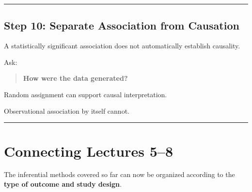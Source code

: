 \documentclass[
  letterpaper,
  DIV=11,
  numbers=noendperiod]{scrreprt}
\begin{document}
\begin{center}\rule{0.5\linewidth}{0.5pt}\end{center}

\section{Step 10: Separate Association from
Causation}\label{step-10-separate-association-from-causation}

A statistically significant association does not automatically establish
causality.

Ask:

\begin{quote}
\textbf{How were the data generated?}
\end{quote}

Random assignment can support causal interpretation.

Observational association by itself cannot.

\begin{center}\rule{0.5\linewidth}{0.5pt}\end{center}


\chapter{Connecting Lectures 5--8}\label{connecting-lectures-58}

The inferential methods covered so far can now be organized according to
the \textbf{type of outcome and study design}.
\end{document}

